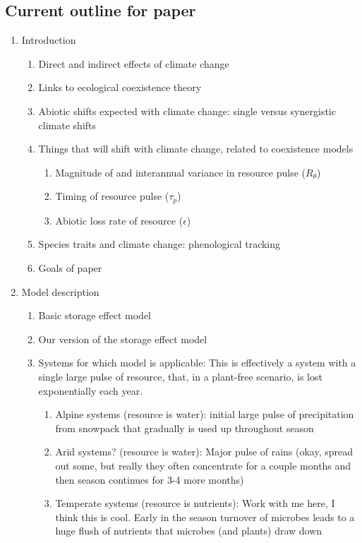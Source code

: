 \documentclass[11pt,a4paper,oneside]{article}
\begin{document}
\subsection{Current outline for paper}
\begin{enumerate}
\item Introduction
\begin{enumerate}
\item Direct and indirect effects of climate change
\item Links to ecological coexistence theory
\item Abiotic shifts expected with climate change: single versus
  synergistic climate shifts
\item Things that will shift with climate change, related to
  coexistence models
\begin{enumerate}
\item Magnitude of and interannual variance in resource pulse (\(R_{\theta}\))
\item Timing of resource pulse (\(\tau_{p}\))
\item Abiotic loss rate of resource (\(\epsilon\))
\end{enumerate}
\item Species traits and climate change: phenological tracking
\item Goals of paper
\end{enumerate}
\item Model description 
\begin{enumerate}
\item Basic storage effect model
\item Our version of the storage effect model
\item Systems for which model is applicable: This is effectively a system with a single large pulse of
resource, that, in a plant-free scenario, is lost exponentially each
year. 
\begin{enumerate}
\item Alpine systems (resource is water): initial large pulse of precipitation from
  snowpack that gradually is used up  throughout season
\item Arid systems? (resource is water): Major pulse of rains (okay, spread out some,
  but really they often concentrate for a couple months and then
  season continues for 3-4 more months)
\item Temperate systems (resource is nutrients): Work with me here, I
  think this is cool. Early in the season turnover of microbes leads
  to a huge flush of nutrients \citep{Zak:1990ar} that microbes (and plants) draw down

\end{enumerate}
\end{enumerate}
\end{enumerate}
\end{document}
